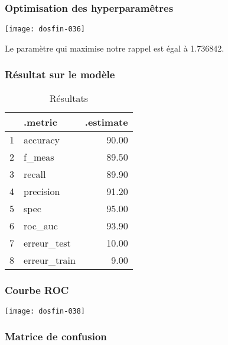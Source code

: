 \documentclass[a4paper,11pt]{article}
\begin{document}
\subsubsection{Optimisation des hyperparamêtres}



\begin{center}

\texttt{[image: dosfin-036]}

\end{center}

Le paramètre qui maximise notre rappel est égal à 1.736842.


\newpage

\subsubsection{Résultat sur le modèle}

\begin{center}


\begin{table}[ht]
\centering
\begin{tabular}{rlr}
  \hline
 & .metric & .estimate \\ 
  \hline
1 & accuracy & 90.00 \\ 
  2 & f\_meas & 89.50 \\ 
  3 & recall & 89.90 \\ 
  4 & precision & 91.20 \\ 
  5 & spec & 95.00 \\ 
  6 & roc\_auc & 93.90 \\ 
  7 & erreur\_test & 10.00 \\ 
  8 & erreur\_train & 9.00 \\ 
   \hline
\end{tabular}
\caption{Résultats} 
\end{table}
\end{center}

\subsubsection{Courbe ROC}

\begin{center}

\texttt{[image: dosfin-038]}

\end{center}

\subsubsection{Matrice de confusion}
\end{document}
